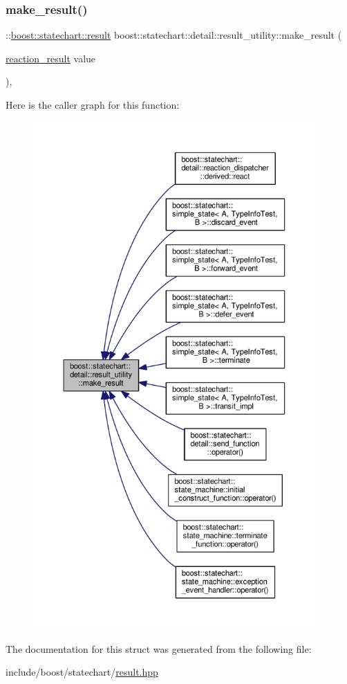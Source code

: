 \subsubsection{\texorpdfstring{make\+\_\+result()}{make\_result()}}
{\footnotesize\ttfamily \+::\mbox{\hyperlink{namespaceboost_1_1statechart_abe807f6598b614d6d87bb951ecd92331}{boost\+::statechart\+::result}} boost\+::statechart\+::detail\+::result\+\_\+utility\+::make\+\_\+result (\begin{DoxyParamCaption}\item[{\mbox{\hyperlink{namespaceboost_1_1statechart_1_1detail_ab091bbb4c29327fb46ee479ea1b7255b}{reaction\+\_\+result}}}]{value }\end{DoxyParamCaption})\hspace{0.3cm}{\ttfamily [inline]}, {\ttfamily [static]}}

Here is the caller graph for this function\+:
\nopagebreak
\begin{figure}[H]
\begin{center}
\leavevmode
\includegraphics[height=550pt]{structboost_1_1statechart_1_1detail_1_1result__utility_a5fa50ca644cdbc3c841f2111130cd3df_icgraph}
\end{center}
\end{figure}


The documentation for this struct was generated from the following file\+:\begin{DoxyCompactItemize}
\item 
include/boost/statechart/\mbox{\hyperlink{result_8hpp}{result.\+hpp}}\end{DoxyCompactItemize}
